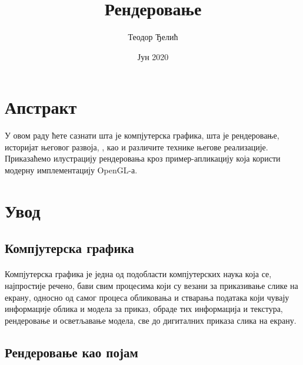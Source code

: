\documentclass[12pt]{article}
\title{Рендеровање}
\author{Теодор Ђелић}
\date{Јун 2020}
\begin{document}
	
	\maketitle
	
	\section*{Апстракт}
	У овом раду ћете сазнати шта је компјутерска графика, шта је рендеровање, историјат његовог развоја, , као и различите технике његове реализације. Приказаћемо илустрацију рендеровања кроз пример-апликацију која користи модерну имплементацију OpenGL-а.
	
	\section{Увод}
	
	\subsection{Компјутерска графика}
	\paragraph{}
	Компјутерска графика је једна од подобласти компјутерских наука која се, најпростије речено, бави свим процесима који су везани за приказивање слике на екрану, односно од самог процеса обликовања и стварања података који чувају информације облика и модела за приказ, обраде тих информација и текстура, рендеровање и осветљавање модела, све до дигиталних приказа слика на екрану.
	\subsection{Рендеровање као појам}
\end{document}
